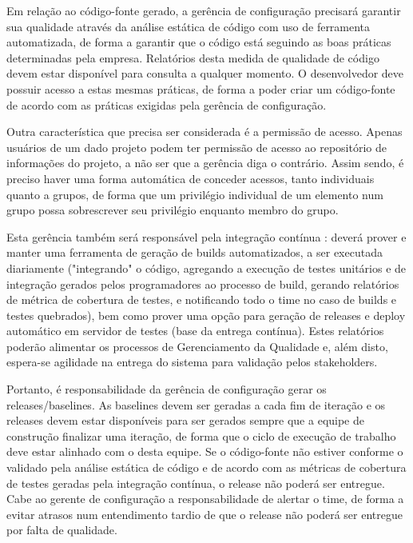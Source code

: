 \documentclass[12pt,journal,compsoc]{IEEEtran}
\begin{document}
Em relação ao código-fonte gerado, a gerência de configuração precisará garantir sua qualidade através da análise estática de código com uso de ferramenta automatizada, de forma a garantir que o código está seguindo as boas práticas determinadas pela empresa. Relatórios desta medida de qualidade de código devem estar disponível para consulta a qualquer momento. O desenvolvedor deve possuir acesso a estas mesmas práticas, de forma a poder criar um código-fonte de acordo com as práticas exigidas pela gerência de configuração. 

Outra característica que precisa ser considerada é a permissão de acesso. Apenas usuários de um dado projeto podem ter permissão de acesso ao repositório de informações do projeto, a não ser que a gerência diga o contrário. Assim sendo, é preciso haver uma forma automática de conceder acessos, tanto individuais quanto a grupos, de forma que um privilégio individual de um elemento num grupo possa sobrescrever seu privilégio enquanto membro do grupo.

Esta gerência também será responsável pela integração contínua \cite{fowler_continuous_integration}: deverá prover e manter uma ferramenta de geração de builds automatizados, a ser executada diariamente ("integrando" o código, agregando a execução de testes unitários e de integração gerados pelos programadores ao processo de build, gerando relatórios de métrica de cobertura de testes, e notificando todo o time no caso de builds e testes quebrados), bem como prover uma opção para geração de releases e deploy automático em servidor de testes (base da entrega contínua). Estes relatórios poderão alimentar os processos de Gerenciamento da Qualidade \cite{society_software_2004} e, além disto, espera-se agilidade na entrega do sistema para validação pelos stakeholders. 

Portanto, é responsabilidade da gerência de configuração gerar os releases/baselines. As baselines devem ser geradas a cada fim de iteração e os releases devem estar disponíveis para ser gerados sempre que a equipe de construção finalizar uma iteração, de forma que o ciclo de execução de trabalho deve estar alinhado com o desta equipe. Se o código-fonte não estiver conforme o validado pela análise estática de código e de acordo com as métricas de cobertura de testes geradas pela integração contínua, o release não poderá ser entregue. Cabe ao gerente de configuração a responsabilidade de alertar o time, de forma a evitar atrasos num entendimento tardio de que o release não poderá ser entregue por falta de qualidade.
\end{document}
